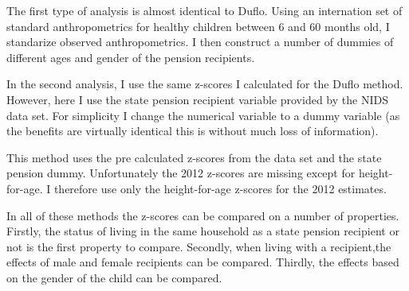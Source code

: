 \documentclass[a4paper]{report}
\begin{document}
\begin{refsection}
The first type of analysis is almost identical to Duflo.
Using an internation set of standard anthropometrics for healthy children between 6 and 60 months old, I standarize observed anthropometrics.
I then construct a number of dummies of different ages and gender of the pension recipients.

In the second analysis, I use the same z-scores I calculated for the Duflo method.
However, here I use the state pension recipient variable provided by the NIDS data set.
For simplicity I change the numerical variable to a dummy variable (as the benefits are virtually identical this is without much loss of information).

This method uses the pre calculated z-scores from the data set and the state pension dummy.
Unfortunately the 2012 z-scores are missing except for height-for-age.
I therefore use only the height-for-age z-scores for the 2012 estimates.

In all of these methods the z-scores can be compared on a number of properties.
Firstly, the status of living in the same household as a state pension recipient or not is the first property to compare.
Secondly, when living with a recipient,the effects of male and female recipients can be compared.
Thirdly, the effects based on the gender of the child can be compared.

\printbibliography
\end{refsection}

% 
\end{document}
